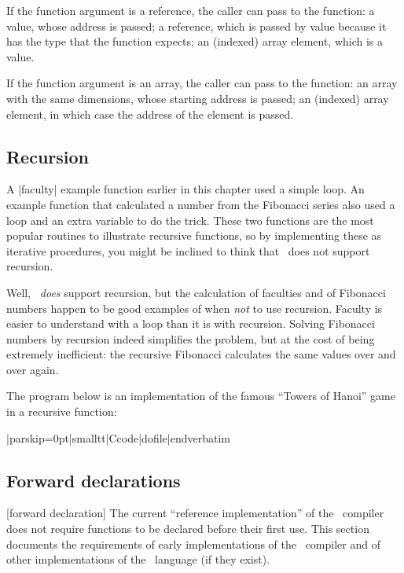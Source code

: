 If the function argument is a reference, the caller can pass to the function:
\beginlist{1em} \compactlist
\list{\lbullet} a value, whose address is passed;
\list{\lbullet} a reference, which is passed by value because it has the type
  that the function expects;
\list{\lbullet} an (indexed) array element, which is a value.
\endlist \goodbreak

If the function argument is an array, the caller can pass to the function:
\beginlist{1em} \compactlist
\list{\lbullet} an array with the same dimensions, whose starting address is
  passed;
\list{\lbullet} an (indexed) array element, in which case the address of the
  element is passed.
\endlist \goodbreak


\subsection{Recursion}
\noindent{}%
A |faculty| example function earlier in this chapter used a simple loop. An
example function that calculated a number from the Fibonacci series also used
a loop and an extra variable to do the trick. These two functions are the most
popular routines to illustrate recursive functions, so by implementing these
as iterative procedures, you might be inclined to think that \Small\ does not
support recursion.

Well, \Small\ {\it does\/} support recursion, but the calculation of faculties
and of Fibonacci numbers happen to be good examples of when
{\it not\/} to use recursion. Faculty is easier to understand with a loop than
it is with recursion. Solving Fibonacci numbers by recursion indeed simplifies
the problem, but at the cost of being extremely inefficient: the recursive
Fibonacci calculates the same values over and over again.

\noindent{}%
The program below is an implementation of the famous ``Towers of Hanoi''
game in a recursive function:

\verbatim|parskip=0pt|smalltt|Ccode|dofile|endverbatim\endlistingx


\subsection{Forward declarations}
 [forward declaration]
The current ``reference implementation'' of the \Small\ compiler does not require
functions to be declared before their first use. This section documents the
requirements of early implementations of the \Small\ compiler and of other
implementations of the \Small\ language (if they exist).

